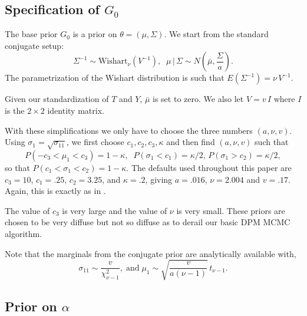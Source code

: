 \subsection{Specification of $G_0$}


The base prior $G_0$ is a prior on $\theta = (\mu,\Sigma)$.
We start from the standard conjugate setup:
$$
\Sigma^{-1} \sim \text{Wishart}_\nu(V^{-1}), \;\; \mu \,|\, \Sigma \sim N(\bar{\mu}, \frac{\Sigma}{a}).
$$
The parametrization of the Wishart distribution is such that $E(\Sigma^{-1}) = \nu \, V^{-1}$.

Given our standardization of $T$ and $Y$, $\bar{\mu}$ is set to zero.  We also let $V = v \, I$ where $I$ is the $2 \times 2$ identity matrix.

With these simplifications we only have to choose the three numbers $(a,\nu,v)$.
Using $\sigma_1 = \sqrt{\sigma_{11}}$,
we first choose $c_1,c_2,c_3,\kappa$ and then find $(a,\nu,v)$ such that
$$
P(-c_3 < \mu_1 < c_3) = 1 - \kappa, \;\; P(\sigma_1 < c_1) = \kappa/2, \, P(\sigma_1 > c_2) = \kappa/2,
$$
so that $P(c_1 < \sigma_1 < c_2) = 1-\kappa$.
The defaults used throughout this paper are $c_3 = 10$, $c_1 = .25$, $c_2 = 3.25$, and $\kappa = .2$,
giving $a = .016$, $\nu = 2.004$ and $v=.17$.
Again, this is exactly as in \citep{CHMR08}.

The value of $c_3$ is very large and the value of $\nu$ is very small.
These priors are chosen to be very diffuse but not so diffuse as to derail our basic DPM MCMC algorithm.


Note that the marginals from the conjugate prior are analytically available with,
$$
\sigma_{11} \sim \frac{v}{\chi^2_{\nu-1}}, \; \text{and} \; \mu_1 \sim \sqrt{\frac{v}{a(\nu-1)}} \, t_{\nu-1}.
$$

\subsection{Prior on $\alpha$}




